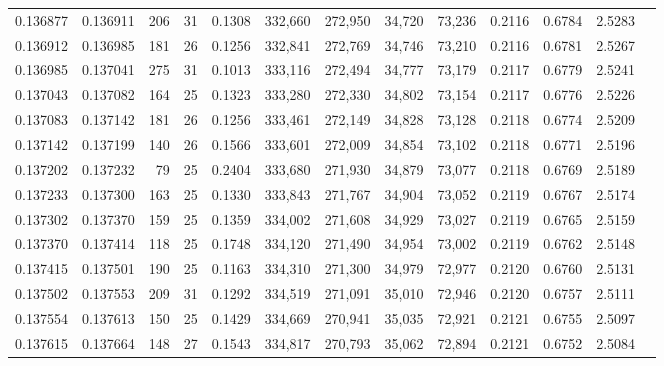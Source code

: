 \begin{tabular}{rrrrrrrrrrrrr}
0.136877 & 0.136911 & 206 &  31 &                                     0.1308 & 332,660 & 272,950 &  34,720 &  73,236 & 0.2116 & 0.6784 & 2.5283 \\
0.136912 & 0.136985 & 181 &  26 &                                     0.1256 & 332,841 & 272,769 &  34,746 &  73,210 & 0.2116 & 0.6781 & 2.5267 \\
0.136985 & 0.137041 & 275 &  31 &                                     0.1013 & 333,116 & 272,494 &  34,777 &  73,179 & 0.2117 & 0.6779 & 2.5241 \\
0.137043 & 0.137082 & 164 &  25 &                                     0.1323 & 333,280 & 272,330 &  34,802 &  73,154 & 0.2117 & 0.6776 & 2.5226 \\
0.137083 & 0.137142 & 181 &  26 &                                     0.1256 & 333,461 & 272,149 &  34,828 &  73,128 & 0.2118 & 0.6774 & 2.5209 \\
0.137142 & 0.137199 & 140 &  26 &                                     0.1566 & 333,601 & 272,009 &  34,854 &  73,102 & 0.2118 & 0.6771 & 2.5196 \\
0.137202 & 0.137232 &  79 &  25 &                                     0.2404 & 333,680 & 271,930 &  34,879 &  73,077 & 0.2118 & 0.6769 & 2.5189 \\
0.137233 & 0.137300 & 163 &  25 &                                     0.1330 & 333,843 & 271,767 &  34,904 &  73,052 & 0.2119 & 0.6767 & 2.5174 \\
0.137302 & 0.137370 & 159 &  25 &                                     0.1359 & 334,002 & 271,608 &  34,929 &  73,027 & 0.2119 & 0.6765 & 2.5159 \\
0.137370 & 0.137414 & 118 &  25 &                                     0.1748 & 334,120 & 271,490 &  34,954 &  73,002 & 0.2119 & 0.6762 & 2.5148 \\
0.137415 & 0.137501 & 190 &  25 &                                     0.1163 & 334,310 & 271,300 &  34,979 &  72,977 & 0.2120 & 0.6760 & 2.5131 \\
0.137502 & 0.137553 & 209 &  31 &                                     0.1292 & 334,519 & 271,091 &  35,010 &  72,946 & 0.2120 & 0.6757 & 2.5111 \\
0.137554 & 0.137613 & 150 &  25 &                                     0.1429 & 334,669 & 270,941 &  35,035 &  72,921 & 0.2121 & 0.6755 & 2.5097 \\
0.137615 & 0.137664 & 148 &  27 &                                     0.1543 & 334,817 & 270,793 &  35,062 &  72,894 & 0.2121 & 0.6752 & 2.5084 \\

\end{tabular}

